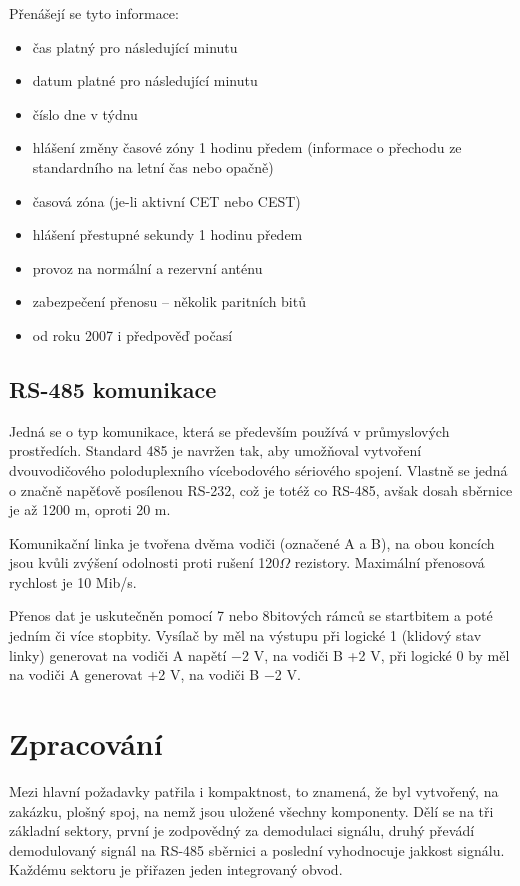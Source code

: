     Přenášejí se tyto informace:

    \begin{itemize}
        \item čas platný pro následující minutu
        \item datum platné pro následující minutu
        \item číslo dne v týdnu
        \item hlášení změny časové zóny 1 hodinu předem (informace o přechodu ze standardního na letní čas nebo opačně)
        \item časová zóna (je-li aktivní CET nebo CEST)
        \item hlášení přestupné sekundy 1 hodinu předem
        \item provoz na normální a rezervní anténu
        \item zabezpečení přenosu – několik paritních bitů
        \item od roku 2007 i předpověď počasí
    \end{itemize}

\subsection{RS-485 komunikace}
    Jedná se o typ komunikace, která se především používá v průmyslových prostředích.
    Standard 485 je navržen tak, aby umožňoval vytvoření dvouvodičového poloduplexního
    vícebodového sériového spojení. Vlastně se jedná o značně napěťově posílenou RS-232, což je
    totéž co RS-485, avšak dosah sběrnice je až 1200 m, oproti 20 m.

    Komunikační linka je tvořena dvěma vodiči (označené A a B), na obou koncích jsou kvůli
    zvýšení odolnosti proti rušení 120$\Omega$ rezistory. Maximální přenosová rychlost je
    10 Mib/s.

    Přenos dat je uskutečněn pomocí 7 nebo 8bitových rámců se startbitem a poté jedním či
    více stopbity. Vysílač by měl na výstupu při logické 1 (klidový stav linky) generovat na vodiči A napětí −2 V, na vodiči B +2 V, při logické 0 by měl na vodiči A generovat +2 V, na vodiči B −2 V.

\section{Zpracování}
Mezi hlavní požadavky patřila i kompaktnost, to znamená, že byl vytvořený, na zakázku,
plošný spoj, na nemž jsou uložené všechny komponenty. Dělí se na tři základní sektory,
první je zodpovědný za demodulaci signálu, druhý převádí demodulovaný signál na RS-485
sběrnici a poslední vyhodnocuje jakkost signálu. Každému sektoru je přiřazen jeden
integrovaný obvod.
